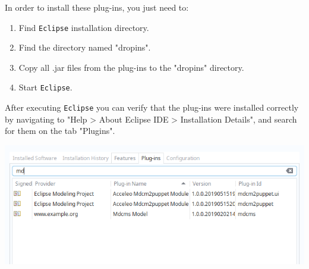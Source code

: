 \documentclass[11pt]{article}
\begin{document}
In order to install these plug-ins, you just need to:

\begin{enumerate}
\item Find \texttt{Eclipse} installation directory.
\item Find the directory named "dropins".
\item Copy all .jar files from the plug-ins to the "dropins" directory.
\item Start \texttt{Eclipse}.
\end{enumerate}

After executing \texttt{Eclipse} you can verify that the plug-ins were installed correctly by navigating to "Help > About Eclipse IDE > Installation
Details", and search for them on the tab "Plugins".

\begin{center}
\includegraphics[width=.9\linewidth]{images/plugins.png}
\end{center}
\end{document}
